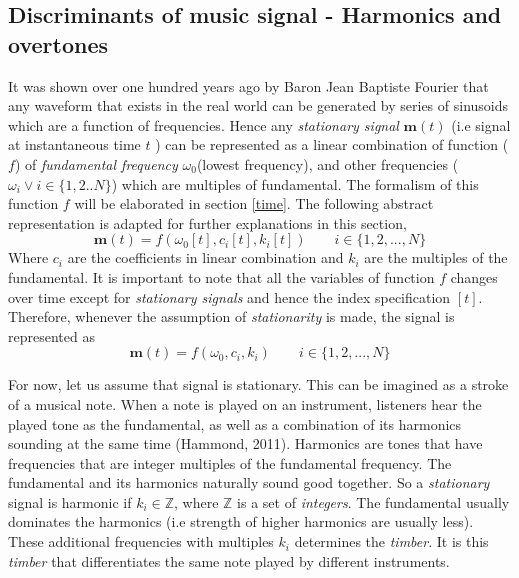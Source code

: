 \subsection{ Discriminants of music signal - Harmonics and overtones }
\label{discriminants}
It was shown over one hundred years ago by Baron Jean Baptiste Fourier that any waveform that exists in the real world can be generated by series of sinusoids which are a function of frequencies. Hence any \textit{stationary signal} $\textbf{m}(t)$ (i.e signal at instantaneous time $t$ ) can be represented as a \gls{linear combination} of function ($f$) of \textit{fundamental frequency} $\omega_{0}$(lowest frequency), and other frequencies ($\omega_{i} \vee i \in \{1,2..N\}$)  which are multiples of fundamental. The formalism of this function $f$ will be elaborated in section \ref{time}. The following abstract representation is adapted for further explanations in this section,
\[
\textbf{m}(t) = f(\omega_{0}[t], c_{i}[t], k_{i}[t]) \qquad i \in \{1, 2,..., N\}
\]
Where $c_{i}$ are the coefficients in \gls{linear combination} and $k_{i}$ are the multiples of the fundamental. It is important to note that all the variables of function $f$ changes over time except for \textit{stationary signals} and hence the index specification $[t]$. Therefore, whenever the assumption of \textit{stationarity} is made, the signal is represented as
\[
\textbf{m}(t) = f(\omega_{0}, c_{i}, k_{i}) \qquad i \in \{1, 2,..., N\}
\]  
\bigskip

\noindent For now, let us assume that signal is stationary. This can be imagined as a stroke of a musical note. When a note is played on an instrument, listeners hear the played tone as the fundamental, as well as a combination of its harmonics sounding at the same time (Hammond, 2011).  Harmonics are tones that have frequencies that are integer multiples of the fundamental frequency. The fundamental and its harmonics naturally sound good together. So a \textit{stationary} signal is harmonic if $k_{i} \in \mathbb{Z}$, where $\mathbb{Z}$ is a set of \textit{integers}. The fundamental usually dominates the harmonics (i.e strength of higher harmonics are usually less). These additional frequencies with multiples $k_{i}$ determines the \textit{timber}. It is this \textit{timber} that differentiates the same note played by different instruments. 

